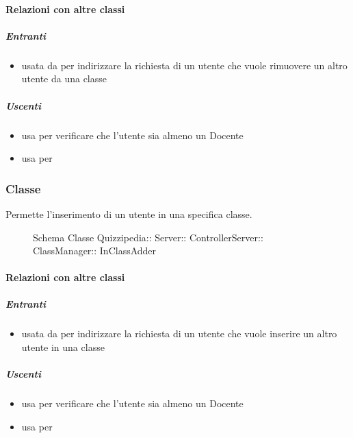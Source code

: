 \paragraph{Relazioni con altre classi}
\subparagraph{Entranti}
\begin{itemize}
\item usata da  per indirizzare la richiesta di un utente che vuole rimuovere un altro utente da una classe
\end{itemize}
\subparagraph{Uscenti}
\begin{itemize}
\item usa  per verificare che l'utente sia almeno un Docente
\item usa  per 
\end{itemize}
\subsubsection{Classe }
Permette l'inserimento di un utente in una specifica classe.
\begin{figure}[H]
\centering
\noindent{}
\caption[Schema Classe InClassAdder]{Schema Classe Quizzipedia:: Server:: ControllerServer:: ClassManager:: InClassAdder}
\end{figure}
\paragraph{Relazioni con altre classi}
\subparagraph{Entranti}
\begin{itemize}
\item usata da  per indirizzare la richiesta di un utente che vuole inserire un altro utente in una classe
\end{itemize}
\subparagraph{Uscenti}
\begin{itemize}
\item usa  per verificare che l'utente sia almeno un Docente
\item usa  per 
\end{itemize}

